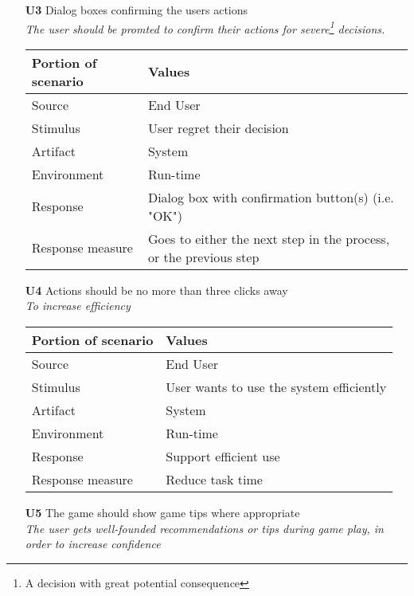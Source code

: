 \begin{itemize}
        \item[\textbf{U3}] Dialog boxes confirming the users actions \\
        \textit{\small{The user should be promted to confirm their actions for severe\footnote{A decision with great potential consequence} decisions.}}
        
        \begin{tabular}{| l | l |}
            \hline
            \rowcolor[gray]{0.8}
            \textbf{Portion of scenario} & \textbf{Values} \\
            \hline
            Source & End User \\
            Stimulus & User regret their decision \\
            Artifact & System \\
            Environment & Run-time \\
            Response & Dialog box with confirmation button(s) (i.e. "OK") \\
            Response measure & Goes to either the next step in the process, or the previous step \\
            \hline
        \end{tabular}
        
        \newpage
        
        \item[\textbf{U4}] Actions should be no more than three clicks away \\
        \textit{\small{To increase efficiency}}
        
        \begin{tabular}{| l | l |}
            \hline
            \rowcolor[gray]{0.8}
            \textbf{Portion of scenario} & \textbf{Values} \\
            \hline
            Source & End User \\
            Stimulus & User wants to use the system efficiently \\
            Artifact & System \\
            Environment & Run-time \\
            Response & Support efficient use \\
            Response measure & Reduce task time \\
            \hline
        \end{tabular}
        
        \item[\textbf{U5}] The game should show game tips where appropriate \\
        \textit{\small{The user gets well-founded recommendations or tips during game play, in order to increase confidence}}
        

\end{itemize}
